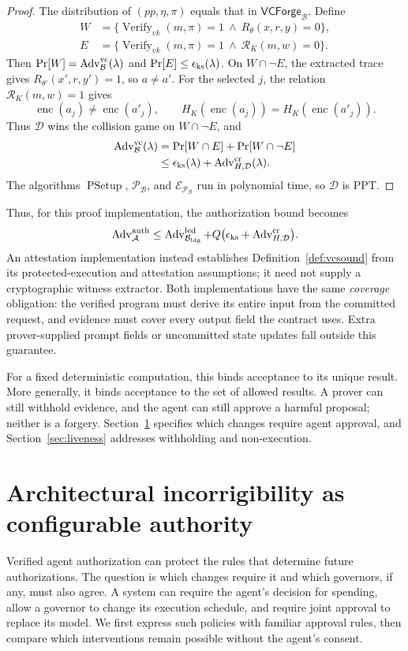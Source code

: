 \documentclass[10pt,letterpaper]{article}
\newcommand{\Verify}{\operatorname{Verify}}
\newcommand{\enc}{\operatorname{enc}}
\begin{document}
\begin{proof}
The distribution of $(pp,\eta,\pi)$ equals that in $\mathsf{VCForge}_{\mathcal B}$. Define
\begin{align*}
 W&=\{\Verify_{vk}(m,\pi)=1\ \land\ R_\theta(x,r,y)=0\},\\
 E&=\{\Verify_{vk}(m,\pi)=1\ \land\ \mathcal R_K(m,w)=0\}.
\end{align*}
Then $\Pr[W]=\operatorname{Adv}^{\rm vc}_{\mathcal B}(\lambda)$ and $\Pr[E]\leq\epsilon_{\rm ks}(\lambda)$. On $W\cap\neg E$, the extracted trace gives $R_{\theta'}(x',r,y')=1$, so $a\ne a'$. For the selected $j$, the relation $\mathcal R_K(m,w)=1$ gives
\[
 \enc(a_j)\ne\enc(a'_j),\qquad
 H_K(\enc(a_j))=H_K(\enc(a'_j)).
\]
Thus $\mathcal D$ wins the collision game on $W\cap\neg E$, and
\begin{align*}
 \operatorname{Adv}^{\rm vc}_{\mathcal B}(\lambda)
 &=\Pr[W\cap E]+\Pr[W\cap\neg E]\\
 &\leq\epsilon_{\rm ks}(\lambda)+\operatorname{Adv}^{\rm cr}_{H,\mathcal D}(\lambda).
\end{align*}
The algorithms $\operatorname{PSetup}$, $\mathcal P_{\mathcal B}$, and $\mathcal E_{\mathcal P_{\mathcal B}}$ run in polynomial time, so $\mathcal D$ is PPT.
\end{proof}
Thus, for this proof implementation, the authorization bound becomes
\[
 \operatorname{Adv}^{\rm auth}_{\mathcal A}
 \leq \operatorname{Adv}^{\rm led}_{\mathcal B_{\rm ldg}}
       +Q\bigl(\epsilon_{\rm ks}+\operatorname{Adv}^{\rm cr}_{H,\mathcal D}\bigr).
\]
An attestation implementation instead establishes Definition~\ref{def:vcsound} from its protected-execution and attestation assumptions; it need not supply a cryptographic witness extractor. Both implementations have the same \emph{coverage} obligation: the verified program must derive its entire input from the committed request, and evidence must cover every output field the contract uses. Extra prover-supplied prompt fields or uncommitted state updates fall outside this guarantee.

For a fixed deterministic computation, this binds acceptance to its unique result. More generally, it binds acceptance to the set of allowed results. A prover can still withhold evidence, and the agent can still approve a harmful proposal; neither is a forgery. Section~\ref{sec:authority} specifies which changes require agent approval, and Section~\ref{sec:liveness} addresses withholding and non-execution.

\section{Architectural incorrigibility as configurable authority}
\label{sec:authority}
Verified agent authorization can protect the rules that determine future authorizations. The question is which changes require it and which governors, if any, must also agree. A system can require the agent's decision for spending, allow a governor to change its execution schedule, and require joint approval to replace its model. We first express such policies with familiar approval rules, then compare which interventions remain possible without the agent's consent.
\end{document}
